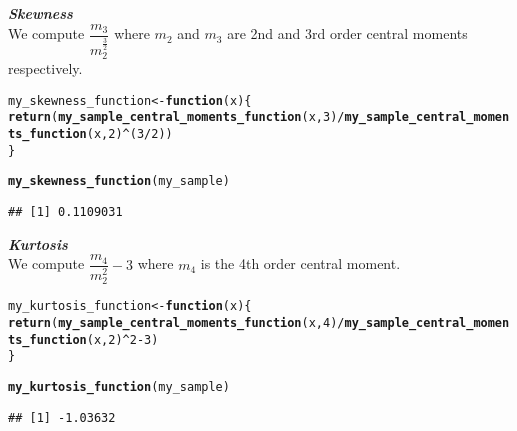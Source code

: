 \documentclass[11pt, a4paper]{article}\usepackage[]{graphicx}\usepackage[]{xcolor}
\makeatletter
\newcommand{\hlnum}[1]{\textcolor[rgb]{0.686,0.059,0.569}{#1}}%
\newcommand{\hlopt}[1]{\textcolor[rgb]{0,0,0}{#1}}%
\newcommand{\hldef}[1]{\textcolor[rgb]{0.345,0.345,0.345}{#1}}%
\newcommand{\hlkwa}[1]{\textcolor[rgb]{0.161,0.373,0.58}{\textbf{#1}}}%
\newcommand{\hlkwb}[1]{\textcolor[rgb]{0.69,0.353,0.396}{#1}}%
\newcommand{\hlkwc}[1]{\textcolor[rgb]{0.333,0.667,0.333}{#1}}%
\newcommand{\hlkwd}[1]{\textcolor[rgb]{0.737,0.353,0.396}{\textbf{#1}}}%
\newenvironment{kframe}{%
 \def\at@end@of@kframe{}%
 \ifinner\ifhmode%
  \def\at@end@of@kframe{\end{minipage}}%
  \begin{minipage}{\columnwidth}%
 \fi\fi%
 \def\FrameCommand##1{\hskip\@totalleftmargin \hskip-\fboxsep
 \colorbox{shadecolor}{##1}\hskip-\fboxsep
     \hskip-\linewidth \hskip-\@totalleftmargin \hskip\columnwidth}%
 \MakeFramed {\advance\hsize-\width
   \@totalleftmargin\z@ \linewidth\hsize
   \@setminipage}}%
 {\par\unskip\endMakeFramed%
 \at@end@of@kframe}
\newenvironment{knitrout}{}{} %
\makeatother
\begin{document}
\newpage

\faArrowAltCircleRight[regular] \textit{\textbf{Skewness}} \\

We compute $\dfrac{m_3}{m_2^\frac{3}{2}}$ where $m_2$ and $m_3$ are 2nd and 3rd order central moments respectively.
\begin{knitrout}\footnotesize
{}\color{fgcolor}\begin{kframe}
\begin{alltt}
\hldef{my_skewness_function} \hlkwb{<-} \hlkwa{function}\hldef{(}\hlkwc{x}\hldef{)\{}
  \hlkwd{return}\hldef{(}\hlkwd{my_sample_central_moments_function}\hldef{(x,} \hlnum{3}\hldef{)} \hlopt{/} \hlkwd{my_sample_central_moments_function}\hldef{(x,} \hlnum{2}\hldef{)}\hlopt{^}\hldef{(}\hlnum{3}\hlopt{/}\hlnum{2}\hldef{))}
\hldef{\}}
\end{alltt}
\end{kframe}
\end{knitrout}

\begin{knitrout}\footnotesize
{}\color{fgcolor}\begin{kframe}
\begin{alltt}
\hlkwd{my_skewness_function}\hldef{(my_sample)}
\end{alltt}
\begin{verbatim}
## [1] 0.1109031
\end{verbatim}
\end{kframe}
\end{knitrout}


\vspace{2cm}

\faArrowAltCircleRight[regular] \textit{\textbf{Kurtosis}} \\

We compute $\dfrac{m_4}{m_2^2} - 3$ where $m_4$ is the 4th order central moment.
\begin{knitrout}\footnotesize
{}\color{fgcolor}\begin{kframe}
\begin{alltt}
\hldef{my_kurtosis_function} \hlkwb{<-} \hlkwa{function}\hldef{(}\hlkwc{x}\hldef{)\{}
  \hlkwd{return}\hldef{(}\hlkwd{my_sample_central_moments_function}\hldef{(x,} \hlnum{4}\hldef{)} \hlopt{/} \hlkwd{my_sample_central_moments_function}\hldef{(x,} \hlnum{2}\hldef{)}\hlopt{^}\hlnum{2} \hlopt{-} \hlnum{3}\hldef{)}
\hldef{\}}
\end{alltt}
\end{kframe}
\end{knitrout}

\begin{knitrout}\footnotesize
{}\color{fgcolor}\begin{kframe}
\begin{alltt}
\hlkwd{my_kurtosis_function}\hldef{(my_sample)}
\end{alltt}
\begin{verbatim}
## [1] -1.03632
\end{verbatim}
\end{kframe}
\end{knitrout}
\end{document}
